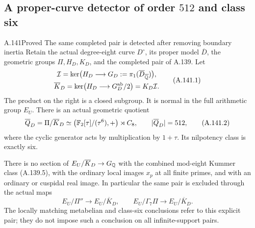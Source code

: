 \subsection{A proper-curve detector of order \(512\) and class six}

\begin{statement}{A.141}{Proved}
{The same completed pair is detected after removing boundary inertia}
Retain the actual degree-eight curve \(D^\circ\), its proper model
\(\overline D\), the geometric groups \(\Pi,H_D,K_D\), and the completed
pair of A.139.  Let
\[
 \begin{gathered}
 \mathcal I=\ker\bigl(H_D\longrightarrow
                         G_D:=\pi_1(\overline D_{\overline{\mathbb Q}})\bigr),\\
 \overline K_D=
   \ker\bigl(H_D\longrightarrow G_D^{\rm ab}/2\bigr)
       =K_D\mathcal I .
 \end{gathered}
\tag{A.141.1}
\]
The product on the right is a closed subgroup.
It is normal in the full arithmetic group \(E_U\).
There is an actual geometric quotient
\[
 \overline Q_D=\Pi/\overline K_D
       \simeq
       \bigl(\mathbb F_2[\tau]/(\tau^6),+\bigr)\rtimes C_8,
       \qquad |\overline Q_D|=512,
\tag{A.141.2}
\]
where the cyclic generator acts by multiplication by \(1+\tau\).
Its nilpotency class is exactly six.

There is no section of \(E_U/\overline K_D\to G_\mathbb Q\) with the
combined mod-eight Kummer class (A.139.5), with the ordinary local
images \(x_p\) at all finite primes, and with an ordinary or cuspidal
real image.  In particular the same pair is excluded through the
actual maps
\[
    E_U/\Pi''\longrightarrow E_U/\overline K_D,\qquad
    E_U/\Gamma_7\Pi\longrightarrow E_U/\overline K_D.
\tag{A.141.3}
\]
The locally matching metabelian and class-six conclusions refer to
this explicit pair; they do not impose such a conclusion on all
infinite-support pairs.
\end{statement}

